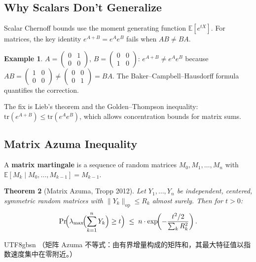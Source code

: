 \documentclass[12pt]{article}
\newtheorem{theorem}{Theorem}[section]
\theoremstyle{definition}
\newtheorem{example}[theorem]{Example}
\theoremstyle{remark}
\begin{document}
\subsection{Why Scalars Don't Generalize}

Scalar Chernoff bounds use the moment generating function $\mathbb{E}[e^{tX}]$.
For matrices, the key identity $e^{A+B} = e^A e^B$ fails when $AB \ne BA$.

\begin{example}
$A = \begin{pmatrix}0&1\\0&0\end{pmatrix}$, $B = \begin{pmatrix}0&0\\1&0\end{pmatrix}$:
$e^{A+B} \ne e^A e^B$ because $AB = \begin{pmatrix}1&0\\0&0\end{pmatrix} \ne
\begin{pmatrix}0&0\\0&1\end{pmatrix} = BA$.
The Baker--Campbell--Hausdorff formula quantifies the correction.
\end{example}

The fix is Lieb's theorem and the Golden--Thompson inequality:
$\mathrm{tr}(e^{A+B}) \le \mathrm{tr}(e^A e^B)$,
which allows concentration bounds for matrix sums.

\subsection{Matrix Azuma Inequality}

A \textbf{matrix martingale} is a sequence of random matrices $M_0, M_1, \ldots, M_n$
with $\mathbb{E}[M_k \mid M_0,\ldots,M_{k-1}] = M_{k-1}$.

\begin{theorem}[Matrix Azuma, Tropp 2012]\label{thm:mazuma}
Let $Y_1, \ldots, Y_n$ be independent, centered, symmetric random matrices with
$\|Y_k\|_{\mathrm{op}} \le R_k$ almost surely.  Then for $t > 0$:
\[
  \Pr\!\Bigl(\lambda_{\max}\!\Bigl(\sum_{k=1}^n Y_k\Bigr) \ge t\Bigr)
  \;\le\; n \cdot \exp\!\!\left(-\frac{t^2/2}{\sum_k R_k^2}\right).
\]
\end{theorem}

\begin{CJK}{UTF8}{gbsn}
（矩阵 Azuma 不等式：由有界增量构成的矩阵和，其最大特征值以指数速度集中在零附近。）
\end{CJK}
\end{document}
